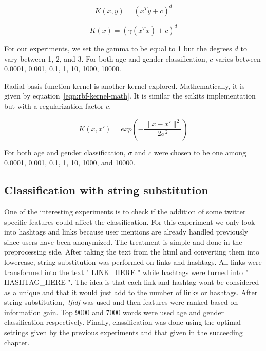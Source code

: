 \documentclass[a4paper]{llncs}
\begin{document}
\begin{equation}
K(x,y) = (x^Ty + c)^d
\label{eqn:poly-kernel-math}
\end{equation}

\begin{equation}
K(x) = (\gamma(x^Tx)+c)^d
\label{eqn:poly-kernel-scikit}
\end{equation}

For our experiments, we set the gamma to be equal to 1 but the degrees $d$ to vary between 1, 2, and 3. For both age and gender classification, $c$ varies between 0.0001, 0.001, 0.1, 1, 10, 1000, 10000.   

Radial basis function kernel is another kernel explored. Mathematically, it is given by equation~\ref{eqn:rbf-kernel-math}. It is similar the scikits implementation but with a regularization factor $c$. 

\begin{equation}
K(x,x')= exp\left( -\frac{\parallel x-x'\parallel^2}{2\sigma^2} \right)
\label{eqn:rbf-kernel-math}
\end{equation} 

For both age and gender classification, $\sigma$ and $c$ were chosen to be one among 0.0001, 0.001, 0.1, 1, 10, 1000, and 10000.

\subsection{Classification with string substitution}
One of the interesting experiments is to check if the addition of some twitter specific features could affect the classification. For this experiment we only look into hashtags and links because user mentions are already handled previously since users have been anonymized. The treatment is simple and done in the preprocessing side. After taking the text from the html and converting them into lowercase, string substitution was performed on links and hashtags. All links were transformed into the text " LINK\_HERE " while hashtags were turned into " HASHTAG\_HERE ". The idea is that each link and hashtag wont be considered as a unique and that it would just add to the number of links or hashtags. After string substitution,~\textit{tfidf} was used and then features were ranked based on information gain. Top 9000 and 7000 words were used age and gender classification respectively. Finally, classification was done using the optimal settings given by the previous experiments and that given in the succeeding chapter. 
\end{document}

